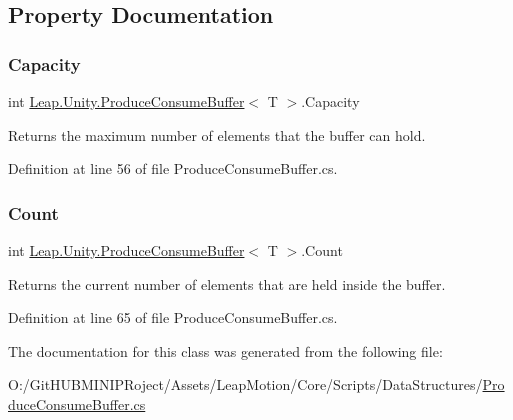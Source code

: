 \subsection{Property Documentation}
\mbox{\label{class_leap_1_1_unity_1_1_produce_consume_buffer_a04753532a728b38e5cc0226c797fbef1}} 
\subsubsection{\texorpdfstring{Capacity}{Capacity}}
{\footnotesize\ttfamily int \mbox{\hyperlink{class_leap_1_1_unity_1_1_produce_consume_buffer}{Leap.\+Unity.\+Produce\+Consume\+Buffer}}$<$ T $>$.Capacity\hspace{0.3cm}{\ttfamily [get]}}



Returns the maximum number of elements that the buffer can hold. 



Definition at line 56 of file Produce\+Consume\+Buffer.\+cs.

\mbox{\label{class_leap_1_1_unity_1_1_produce_consume_buffer_ab7a378bf347d928035288ae0e790b938}} 
\subsubsection{\texorpdfstring{Count}{Count}}
{\footnotesize\ttfamily int \mbox{\hyperlink{class_leap_1_1_unity_1_1_produce_consume_buffer}{Leap.\+Unity.\+Produce\+Consume\+Buffer}}$<$ T $>$.Count\hspace{0.3cm}{\ttfamily [get]}}



Returns the current number of elements that are held inside the buffer. 



Definition at line 65 of file Produce\+Consume\+Buffer.\+cs.



The documentation for this class was generated from the following file\+:\begin{DoxyCompactItemize}
\item 
O\+:/\+Git\+H\+U\+B\+M\+I\+N\+I\+P\+Roject/\+Assets/\+Leap\+Motion/\+Core/\+Scripts/\+Data\+Structures/\mbox{\hyperlink{_produce_consume_buffer_8cs}{Produce\+Consume\+Buffer.\+cs}}\end{DoxyCompactItemize}
